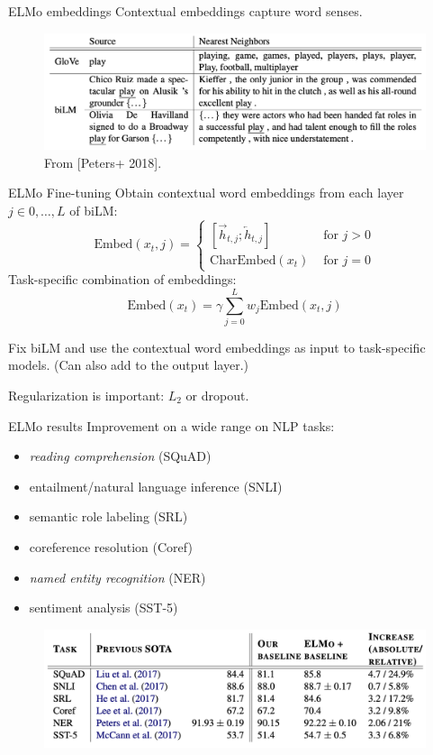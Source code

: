 \documentclass[usenames,dvipsnames,notes]{beamer}
\begin{document}
\begin{frame}
    {ELMo embeddings}
    Contextual embeddings capture word senses.
    \begin{figure}
        \includegraphics[width=.9\textwidth]{figures/elmo-ex}
        \caption{From [Peters+ 2018].}
    \end{figure}
\end{frame}

\begin{frame}
    {ELMo Fine-tuning}
    Obtain contextual word embeddings from each layer $j\in{0, \ldots, L}$ of biLM:
    $$
        \text{Embed}(x_t, j) = \begin{cases}
            [\overrightarrow{h}_{t,j}; \overleftarrow{h}_{t,j}] & \text{ for } j > 0 \\
            \text{CharEmbed}(x_t) & \text{ for } j = 0
        \end{cases}
    $$
    Task-specific combination of embeddings:
    $$
    \text{Embed}(x_t) = \gamma \sum_{j=0}^L w_j\text{Embed}(x_t, j)
    $$

    Fix biLM and use the contextual word embeddings as input to task-specific models. (Can also add to the output layer.)

    Regularization is important: $L_2$ or dropout.
\end{frame}

\begin{frame}
    {ELMo results}
    Improvement on a wide range on NLP tasks:\\
    \begin{itemize}
        \item \emph{reading comprehension} (SQuAD)
        \item entailment/natural language inference (SNLI)
        \item semantic role labeling (SRL)
        \item coreference resolution (Coref) 
        \item \emph{named entity recognition} (NER) 
        \item sentiment analysis (SST-5)
    \end{itemize}
    \vspace{-2em}
    \begin{figure}
        \includegraphics[width=.9\textwidth]{figures/elmo-res}
    \end{figure}
\end{frame}
\end{document}
